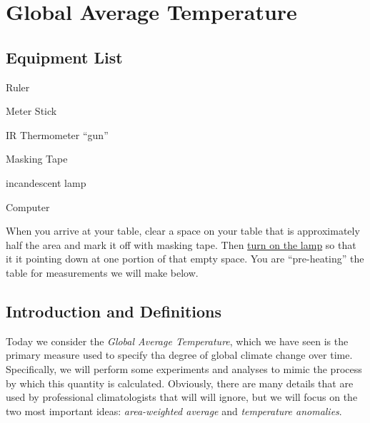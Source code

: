 

\chapter{Global Average Temperature}

\section*{Equipment List}

\begin{multicols}{2}   %
\begin{equipment}
  \item Ruler
  \item Meter Stick
  \item IR Thermometer ``gun''
  \item Masking Tape
  \item incandescent lamp
  \item Computer
\end{equipment}
\end{multicols}

\vspace{0.5cm}
 When you arrive at your table, clear a space on your table that is approximately half the area and mark it off with masking tape.  Then \underline{turn on the lamp} so that it it pointing down at one portion of that empty space.  You are ``pre-heating'' the table for measurements we will make below.

\section{Introduction and Definitions}

Today we consider the {\em Global Average Temperature}, which we have seen is the primary measure used to specify tha degree of global climate change over time.  Specifically, we will perform some experiments and analyses to mimic the process by which this quantity is calculated.  Obviously, there are many details that are used by professional climatologists that will will ignore, but we will focus on the two most important ideas: {\em area-weighted average} and {\em temperature anomalies}.

